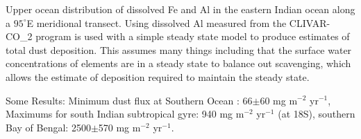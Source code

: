 Upper ocean distribution of dissolved Fe and Al in the eastern Indian ocean along a $95^{\circ}$E meridional transect.
Using dissolved Al measured from the CLIVAR-CO\_{2} program is used with a simple steady state model to produce estimates of total dust deposition. This assumes many things including that the surface water concentrations of elements are in a steady state to balance out scavenging, which allows the estimate of deposition required to maintain the steady state.

Some Results:
Minimum dust flux at Southern Ocean : 66$\pm$60 mg m$^{-2}$ yr$^{-1}$, 
Maximums for south Indian subtropical gyre: 940 mg m$^{-2}$ yr$^{-1}$ (at 18S),
southern Bay of Bengal: 2500$\pm$570 mg m$^{-2}$ yr$^{-1}$.
  
  
  